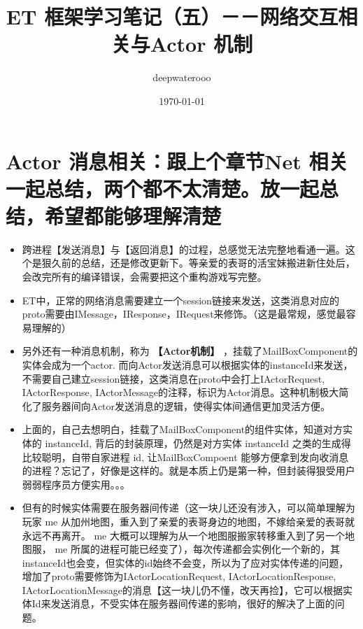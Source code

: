 \documentclass[9pt, b5paper]{article}
\author{deepwaterooo}
\date{\today}
\title{ET 框架学习笔记（五）－－网络交互相关与Actor 机制}
\begin{document}
\maketitle
\tableofcontents

\section{Actor 消息相关：跟上个章节Net 相关一起总结，两个都不太清楚。放一起总结，希望都能够理解清楚}
\label{sec-1}
\begin{itemize}
\item 跨进程【发送消息】与【返回消息】的过程，总感觉无法完整地看通一遍。这个是狠久前的总结，还是修改更新下。等亲爱的表哥的活宝妹搬进新住处后，会改完所有的编译错误，会需要把这个重构游戏写完整。
\item ET中，正常的网络消息需要建立一个session链接来发送，这类消息对应的proto需要由IMessage，IResponse，IRequest来修饰。（这是最常规，感觉最容易理解的）
\item 另外还有一种消息机制，称为 \textbf{【Actor机制】} ，挂载了MailBoxComponent的实体会成为一个actor. 而向Actor发送消息可以根据实体的instanceId来发送，不需要自己建立session链接，这类消息在proto中会打上IActorRequest, IActorResponse, IActorMessage的注释，标识为Actor消息。这种机制极大简化了服务器间向Actor发送消息的逻辑，使得实体间通信更加灵活方便。
\item 上面的，自己去想明白，挂载了MailBoxComponent的组件实体，知道对方实体的 instanceId, 背后的封装原理，仍然是对方实体 instanceId 之类的生成得比较聪明，自带自家进程 id, 让MailBoxCompoent 能够方便拿到发向收消息的进程？忘记了，好像是这样的。就是本质上仍是第一种，但封装得狠受用户弱弱程序员方便实用。。。
\item 但有的时候实体需要在服务器间传递（这一块儿还没有涉入，可以简单理解为玩家 me 从加州地图，重入到了亲爱的表哥身边的地图，不嫁给亲爱的表哥就永远不再离开。 me 大概可以理解为从一个地图服搬家转移重入到了另一个地图服， me 所属的进程可能已经变了），每次传递都会实例化一个新的，其instanceId也会变，但实体的id始终不会变，所以为了应对实体传递的问题，增加了proto需要修饰为IActorLocationRequest, IActorLocationResponse, IActorLocationMessage的消息【这一块儿仍不懂，改天再捡】，它可以根据实体Id来发送消息，不受实体在服务器间传递的影响，很好的解决了上面的问题。
\end{itemize}
\end{document}
